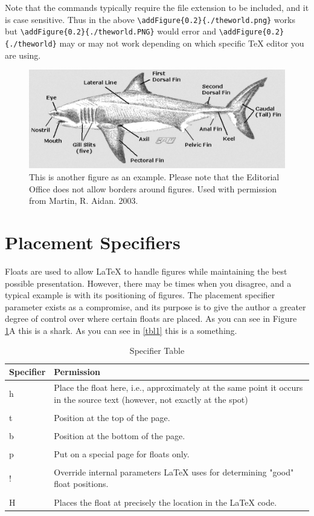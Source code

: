 Note that the commands typically require the file extension to be included, and it is case sensitive. Thus in the above \verb|\addFigure{0.2}{./theworld.png}| works but \verb|\addFigure{0.2}{./theworld.PNG}| would error and \verb|\addFigure{0.2}{./theworld}| may or may not work depending on which specific TeX editor you are using.

\begin{figure}
    \centering
    \includegraphics{Images/sharkimg.png}    
    \caption[This is another figure.] {This is another figure as an example. Please note that the Editorial Office does not allow borders around figures. Used with permission from Martin, R. Aidan.  2003. }
    \label{fig:my_label}
\end{figure}{}
\section{Placement Specifiers}

Floats are used to allow LaTeX to handle figures while maintaining the best possible presentation. However, there may be times when you disagree, and a typical example is with its positioning of figures. 
The placement specifier parameter exists as a compromise, and its purpose is to give the author a greater degree of control over where certain floats are placed. As you can see in Figure \ref{fig:my_label}A this is a shark. As you can see in \ref{tbl1} this is a something.

\begin{table}[H]
\caption{Specifier Table}
\begin{tabular}{l p{14cm} }
\hline
Specifier & Permission \\ \hline
h & Place the float here, i.e., approximately at the same point it occurs in the source text (however, not exactly at the spot) \\
\\
t & Position at the top of the page.  \\
\\
b & Position at the bottom of the page.  \\
\\
p & Put on a special page for floats only.  \\
\\
! & Override internal parameters LaTeX uses for determining "good" float positions. \\
\\
H & Places the float at precisely the location in the LaTeX code. \\
\hline
\end{tabular}
\end{table}

